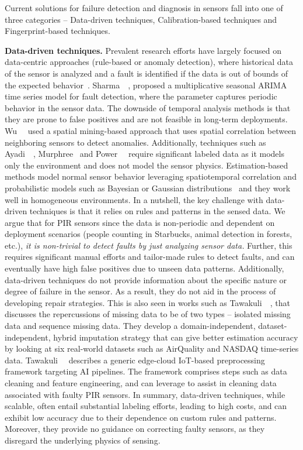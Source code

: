 Current solutions for failure detection and diagnosis in sensors fall into one of three categories -- \ca Data-driven techniques, \cb Calibration-based techniques and \cc Fingerprint-based techniques.

\textbf{Data-driven techniques.} Prevalent research efforts have largely focused on data-centric approaches (rule-based or anomaly detection), where historical data %
of the sensor is analyzed and a fault is identified if the data is out of bounds of the expected behavior~\cite{rashid2016collect, 10.1145/3365871.3365872}.  Sharma~\etal~\cite{10.1145/1754414.1754419}, proposed a multiplicative seasonal ARIMA time series model for fault detection, where the parameter captures periodic behavior in the sensor data. %
The downside of temporal analysis methods is that
they are prone to false positives and are not feasible in long-term
deployments. Wu~\etal~\cite{4262542} used a spatial mining-based approach that uses spatial correlation between neighboring sensors to detect anomalies. Additionally, techniques such as Ayadi~\etal~\cite{7505190}, Murphree~\cite{7589589} and Power~\etal~\cite{10.1145/3365871.3365872} require significant labeled data as it models only the environment and does not model the sensor physics. Estimation-based methods model normal sensor behavior leveraging spatiotemporal correlation and probabilistic models such as Bayesian or Gaussian distributions~\cite{10.1145/1140104.1140114} and they work well in homogeneous environments. In a nutshell, the key challenge with data-driven techniques is that it relies on rules and patterns in the sensed data.
We argue that for PIR sensors since the data is non-periodic and dependent on deployment scenarios (\eg people counting in Starbucks,   
animal detection in forests, etc.), \textit{it is non-trivial to detect faults by just analyzing sensor data.} Further, this requires significant manual efforts and tailor-made rules to detect faults, and can eventually have high false positives due to unseen data patterns. Additionally, data-driven techniques do not provide information about the specific nature or degree of failure in the sensor. As a result, they do not aid in the process of developing repair strategies. This is also seen in works such as Tawakuli~\etal~\cite{tawakuli2023experience}, that discusses the repercussions of missing data to be of two types -- \ca isolated missing data and \cb sequence missing data. They develop a domain-independent, dataset-independent, hybrid imputation strategy that can give better estimation accuracy by looking at six real-world datasets such as AirQuality and NASDAQ time-series data. Tawakuli~\etal~\cite{Tawakuli2022TransformingID} describes a generic edge-cloud IoT-based preprocessing framework targeting AI pipelines. The framework comprises steps such as data cleaning and feature engineering, and can leverage \sol to assist in cleaning data associated with faulty PIR sensors. In summary, data-driven techniques, while scalable, often entail substantial labeling efforts, leading to high costs, and can exhibit low accuracy due to their dependence on custom rules and patterns. Moreover, they provide no guidance on correcting faulty sensors, as they disregard the underlying physics of sensing.

